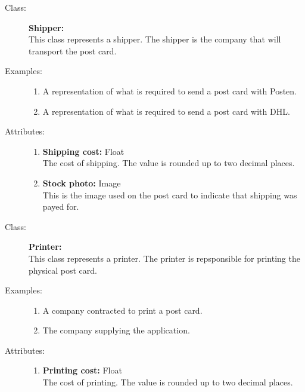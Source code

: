 \documentclass[10pt,a4paper]{article}
\begin{document}
\hrulefill

\begin{description}
\item[Class:] \textbf{Shipper:} \hfill \\
This class represents a shipper. The shipper is the company that will transport the post card. 

\item[Examples:] \hfill
\begin{enumerate}
\item A representation of what is required to send a post card with Posten.
\item A representation of what is required to send a post card with DHL.
\end{enumerate}

\item[Attributes:] \hfill
\begin{enumerate}
\item \textbf{Shipping cost:} Float \hfill \\The cost of shipping. The value is rounded up to two decimal places.
\item \textbf{Stock photo:} Image \hfill \\This is the image used on the post card to indicate that shipping was payed for.
\end{enumerate}
\end{description}

\hrulefill

\begin{description}
\item[Class:] \textbf{Printer:} \hfill \\
This class represents a printer. The printer is repsponsible for printing the physical post card. 

\item[Examples:] \hfill
\begin{enumerate}
\item A company contracted to print a post card.
\item The company supplying the application.
\end{enumerate}

\item[Attributes:] \hfill
\begin{enumerate}
\item \textbf{Printing cost:} Float \hfill \\The cost of printing. The value is rounded up to two decimal places.
\end{enumerate}
\end{description}
\end{document}
